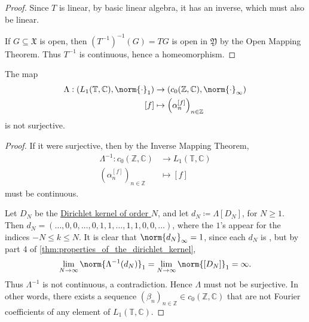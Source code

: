 \documentclass[notoc,notitlepage]{tufte-book}
\begin{document}
\begin{proof}
  Since $T$ is linear, by basic linear algebra, it has an inverse,
  which must also be linear.

  If $G \subseteq \mathfrak{X}$ is open, then $(T^{-1})^{-1}(G) = TG$ is open
  in $\mathfrak{Y}$ by the Open Mapping Theorem.
  Thus $T^{-1}$ is continuous, hence a homeomorphism.
\end{proof}

\begin{thm}\label{thm:_l_1_mathbb_t_mathbb_c_and_c_0_mathbb_z_mathbb_c_are_not_isomorphic}
  The map
  \begin{align*}
    \Lambda : (L_1(\mathbb{T}, \mathbb{C}), \norm{\cdot}_1)
          &\to (c_0(\mathbb{Z}, \mathbb{C}), \norm{\cdot}_\infty) \\
      [f] &\mapsto \left( \alpha_n^{[f]} \right)_{n \in \mathbb{Z}}
  \end{align*}
  is not surjective.
\end{thm}

\begin{proof}
  If it were surjective, then by the Inverse Mapping Theorem,
  \begin{align*}
    \Lambda^{-1} : c_0(\mathbb{Z}, \mathbb{C}) &\to L_1(\mathbb{T}, \mathbb{C}) \\
          \left( \alpha_n^{[f]} \right)_{n \in \mathbb{Z}} &\mapsto [f]
  \end{align*}
  must be continuous.

  Let $D_N$ be the \hyperref[defn:dirichlet_kernel_of_order_n_]{Dirichlet kernel
  of order $N$}, and let $d_N \coloneqq \Lambda[D_N]$, for $N \geq 1$.
  Then $d_N = (\ldots, 0, 0, \ldots, 0, 1, 1, \ldots, 1, 1, 0, 0, \ldots)$,
  where the $1$'s appear for the indices $-N \leq k \leq N$.
  It is clear that $\norm{d_N}_{\infty} = 1$,
  since each $d_N$ is ,
  but by part 4 of \cref{thm:properties_of_the_dirichlet_kernel},
  \begin{equation*}
    \lim_{N \to \infty} \norm{\Lambda^{-1}(d_N)}_1
    = \lim_{N \to \infty} \norm{[D_N]}_1 = \infty.
  \end{equation*}
  Thus $\Lambda^{-1}$ is not continuous, a contradiction.
  Hence $\Lambda$ must not be surjective.
  In other words, there exists a sequence $(\beta_n)_{n \in \mathbb{Z}}
  \in c_0(\mathbb{Z}, \mathbb{C})$ that are not Fourier coefficients
  of any element of $L_1(\mathbb{T}, \mathbb{C})$.
\end{proof}
\end{document}
